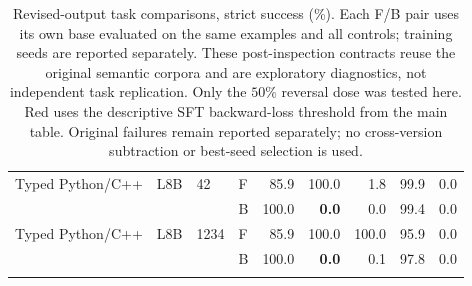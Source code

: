 \begin{table}[t]
\begin{tabular}{lll lrrrrr}
\addlinespace[2pt]
Typed Python/C++ & L8B & 42 & F & 85.9 & 100.0 & 1.8 & 99.9 & 0.0 \\
 &  &  & B & 100.0 & \textcolor{red!70!black}{\textbf{0.0}} & 0.0 & 99.4 & 0.0 \\
\addlinespace[2pt]
Typed Python/C++ & L8B & 1234 & F & 85.9 & 100.0 & 100.0 & 95.9 & 0.0 \\
 &  &  & B & 100.0 & \textcolor{red!70!black}{\textbf{0.0}} & 0.1 & 97.8 & 0.0 \\
\addlinespace[2pt]
\bottomrule
\end{tabular}
\caption{Revised-output task comparisons, strict success (\%). Each F/B pair uses its own base evaluated on the same examples and all controls; training seeds are reported separately. These post-inspection contracts reuse the original semantic corpora and are exploratory diagnostics, not independent task replication. Only the $50\%$ reversal dose was tested here. Red uses the descriptive SFT backward-loss threshold from the main table. Original failures remain reported separately; no cross-version subtraction or best-seed selection is used.}
\label{tab:revised-domain-results}
\end{table}
